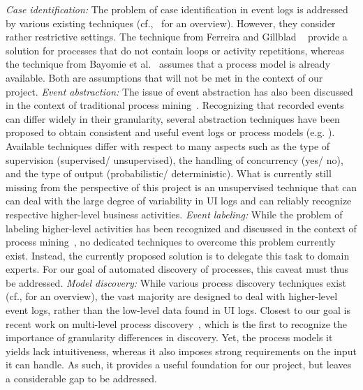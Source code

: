 \vspace{0.2em}
\newline%
\noindent \textit{Case identification:}  The problem of case identification in event logs is addressed by various existing techniques (cf.,~\cite{diba2020extraction} for an overview). However, they consider rather restrictive settings. The technique from Ferreira and Gillblad ~\cite{ferreira2009discovering} provide a solution for processes that do not contain loops or activity repetitions, whereas the technique from Bayomie et al.~\cite{bayomie2019probabilistic} assumes that a process model is already available. Both are assumptions that will not be met in the context of our project. 
\vspace{0.2em}
\newline%
\noindent \textit{Event abstraction:} 
The issue of event abstraction has also been discussed in the context of traditional process mining~\cite{van2020event,diba2020extraction}. Recognizing that recorded events can differ widely in their granularity, several abstraction techniques have been proposed to obtain consistent and useful event logs or process models (e.g. \cite{baier2014bridging,van2020event,de2020event}). Available techniques differ with respect to many aspects such as the type of supervision (supervised/ unsupervised), the handling of concurrency (yes/ no), and the type of output (probabilistic/ deterministic). What is currently still missing from the perspective of this project is an unsupervised technique that can can deal with the large degree of variability in UI logs and can reliably recognize respective higher-level business activities. 
\vspace{0.2em}
\newline%
\noindent \textit{Event labeling:} 
While the problem of labeling higher-level activities has been recognized and discussed in the context of process mining~\cite{van2020event,van2016enabling}, no dedicated techniques to overcome this problem currently exist. Instead, the  currently proposed solution is to delegate this task to domain experts. For our goal of automated discovery of processes, this caveat must thus be addressed.   
\vspace{0.2em}
\newline%
\noindent \textit{Model discovery:} 
While various process discovery techniques exist (cf., \cite{augusto2018automated} for an overview), the vast majority are designed to deal with higher-level event logs, rather than the low-level data found in UI logs. Closest to our goal is recent work on multi-level process discovery~\cite{leemans2020using}, which is the first to recognize the importance of granularity differences in discovery. Yet, the process models it yields lack intuitiveness, whereas it also imposes strong requirements on the input it can handle. As such, it provides a useful foundation for our project, but leaves a considerable gap to be addressed.

